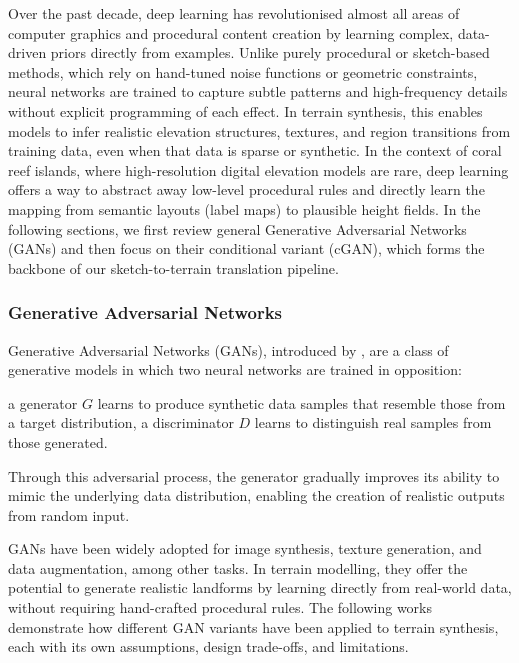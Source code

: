 Over the past decade, deep learning has revolutionised almost all areas of computer graphics and procedural content creation by learning complex, data-driven priors directly from examples. Unlike purely procedural or sketch-based methods, which rely on hand-tuned noise functions or geometric constraints, neural networks are trained to capture subtle patterns and high-frequency details without explicit programming of each effect. In terrain synthesis, this enables models to infer realistic elevation structures, textures, and region transitions from training data, even when that data is sparse or synthetic. In the context of coral reef islands, where high-resolution digital elevation models are rare, deep learning offers a way to abstract away low-level procedural rules and directly learn the mapping from semantic layouts (label maps) to plausible height fields. In the following sections, we first review general Generative Adversarial Networks (GANs) and then focus on their conditional variant (cGAN), which forms the backbone of our sketch-to-terrain translation pipeline.

\subsubsection{Generative Adversarial Networks}
\label{sec:coral-island-sota-GAN}

Generative Adversarial Networks (GANs), introduced by \cite{Goodfellow2014}, are a class of generative models in which two neural networks are trained in opposition: 
\begin{Itemize}
    \Item{} a generator $G$ learns to produce synthetic data samples that resemble those from a target distribution, 
    \Item{} a discriminator $D$ learns to distinguish real samples from those generated. 
\end{Itemize}

Through this adversarial process, the generator gradually improves its ability to mimic the underlying data distribution, enabling the creation of realistic outputs from random input.

GANs have been widely adopted for image synthesis, texture generation, and data augmentation, among other tasks. In terrain modelling, they offer the potential to generate realistic landforms by learning directly from real-world data, without requiring hand-crafted procedural rules. The following works demonstrate how different GAN variants have been applied to terrain synthesis, each with its own assumptions, design trade-offs, and limitations.

